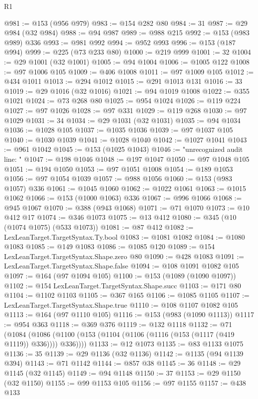 \begin{lexlean}{R1}
\begin{coremodule}
@981 := @153 (@956 @979)
@983 := @154 @282 @80
@984 := 31
@987 := @29 @984 (@32 @984)
@988 := @94 @987
@989 := @988 @215
@992 := @153 (@983 @989) @336
@993 := @981 @992
@994 := @952 @993
@996 := @153 (@187 @994)
@999 := @225 (@73 @233 @80)
@1000 := @219 @999
@1001 := 32
@1004 := @29 @1001 (@32 @1001)
@1005 := @94 @1004
@1006 := @1005 @122
@1008 := @97 @1006 @105
@1009 := @406 @1008
@1011 := @97 @1009 @105
@1012 := @434 @1011
@1013 := @294 @1012
@1015 := @291 @1013 @131
@1016 := 33
@1019 := @29 @1016 (@32 @1016)
@1021 := @94 @1019 @1008
@1022 := @355 @1021
@1024 := @73 @268 @80
@1025 := @954 @1024
@1026 := @119 @224
@1027 := @97 @1026
@1028 := @97 @331
@1029 := @119 @268
@1030 := @97 @1029
@1031 := 34
@1034 := @29 @1031 (@32 @1031)
@1035 := @94 @1034
@1036 := @1028 @105
@1037 := @1035 @1036
@1039 := @97 @1037 @105
@1040 := @1030 @1039
@1041 := @1028 @1040
@1042 := @1027 @1041
@1043 := @961 @1042
@1045 := @153 (@1025 @1043)
@1046 := "unrecognized audit line: "
@1047 := @198 @1046
@1048 := @197 @1047
@1050 := @97 @1048 @105
@1051 := @194 @1050
@1053 := @97 @1051 @1008
@1054 := @189 @1053
@1056 := @97 @1054 @1039
@1057 := @988 @1056
@1060 := @153 (@983 @1057) @336
@1061 := @1045 @1060
@1062 := @1022 @1061
@1063 := @1015 @1062
@1066 := @153 (@1000 @1063) @336
@1067 := @996 @1066
@1068 := @945 @1067
@1070 := @388 (@943 @1068)
@1071 := @71 @1070
@1073 := @10 @412 @17
@1074 := @346 @1073
@1075 := @13 @412
@1080 := @345 (@10 (@1074 @1075) (@533 @1073))
@1081 := @87 @412
@1082 := LexLeanTarget.TargetSyntax.Ty.bool
@1083 := @1081 @1082
@1084 := @1080 @1083
@1085 := @149 @1083
@1086 := @1085 @120
@1089 := @154 LexLeanTarget.TargetSyntax.Shape.zero @80
@1090 := @428 @1083
@1091 := LexLeanTarget.TargetSyntax.Shape.false
@1094 := @108 @1091 @1082 @105
@1097 := @164 (@97 @1094 @105)
@1100 := @153 (@1089 (@1090 @1097))
@1102 := @154 LexLeanTarget.TargetSyntax.Shape.succ
@1103 := @171 @80
@1104 := @1102 @1103
@1105 := @367 @165
@1106 := @1085 @1105
@1107 := LexLeanTarget.TargetSyntax.Shape.true
@1110 := @108 @1107 @1082 @105
@1113 := @164 (@97 @1110 @105)
@1116 := @153 (@983 (@1090 @1113))
@1117 := @954 @363
@1118 := @369 @376
@1119 := @132 @1118
@1132 := @71
    (@1084 (@1086 (@1100 (@153 (@1104 (@1106 (@1116 (@153 (@1117 (@419 @1119)) @336)))) @336))))
@1133 := @12 @1073
@1135 := @83 @1133 @1075
@1136 := 35
@1139 := @29 @1136 (@32 @1136)
@1142 := @1135 (@94 @1139 @394)
@1143 := @71 @1142
@1144 := @857 @38
@1145 := 36
@1148 := @29 @1145 (@32 @1145)
@1149 := @94 @1148
@1150 := 37
@1153 := @29 @1150 (@32 @1150)
@1155 := @99 @1153 @105
@1156 := @97 @1155
@1157 := @438 @133

\end{coremodule}
\end{lexlean}

